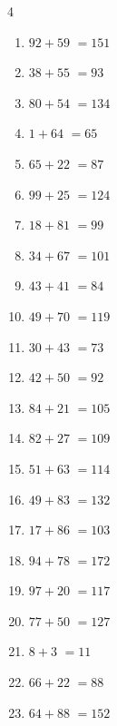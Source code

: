 \begin{multicols}{4}
\begin{enumerate}
  \item $92+59$
        $=151$

  \item $38+55$
        $=93$

  \item $80+54$
        $=134$

  \item $1+64$
        $=65$

  \item $65+22$
        $=87$

  \item $99+25$
        $=124$

  \item $18+81$
        $=99$

  \item $34+67$
        $=101$

  \item $43+41$
        $=84$

  \item $49+70$
        $=119$

  \item $30+43$
        $=73$

  \item $42+50$
        $=92$

  \item $84+21$
        $=105$

  \item $82+27$
        $=109$

  \item $51+63$
        $=114$

  \item $49+83$
        $=132$

  \item $17+86$
        $=103$

  \item $94+78$
        $=172$

  \item $97+20$
        $=117$

  \item $77+50$
        $=127$

  \item $8+3$
        $=11$

  \item $66+22$
        $=88$

  \item $64+88$
        $=152$

\columnbreak %


\end{enumerate}
\end{multicols}
